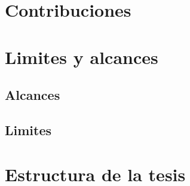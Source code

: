 \section{Contribuciones}


\section{Limites y alcances}

\subsection{Alcances}


\subsection{Limites}



\section{Estructura de la tesis}






